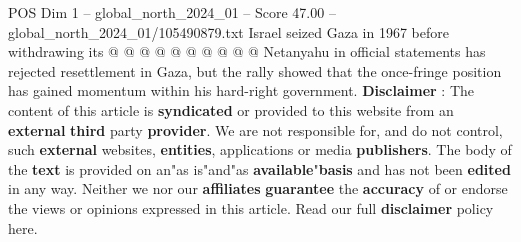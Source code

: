 \begin{textsample}{POS Dim 1 – global\_north\_2024\_01 – Score 47.00 – global\_north\_2024\_01/105490879.txt}
Israel seized Gaza in 1967 before withdrawing its @ @ @ @ @ @ @ @ @ @ Netanyahu in official statements has rejected resettlement in Gaza, but the rally showed that the once-fringe position has gained momentum within his hard-right government. \textbf{Disclaimer} : The content of this article is \textbf{syndicated} or provided to this website from an \textbf{external} \textbf{third} party \textbf{provider}.
We are not responsible for, and do not control, such \textbf{external} websites, \textbf{entities}, applications or media \textbf{publishers}.
The body of the \textbf{text} is provided on an"as is"and"as \textbf{available}"\textbf{basis} and has not been \textbf{edited} in any way.
Neither we nor our \textbf{affiliates} \textbf{guarantee} the \textbf{accuracy} of or endorse the views or opinions expressed in this article.
Read our full \textbf{disclaimer} policy here.

\end{textsample}
